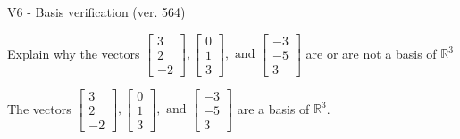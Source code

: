 \begin{exercise}
  \begin{exerciseTitle}V6 - Basis verification (ver. 564)\end{exerciseTitle}
  \begin{exerciseStatement}
    Explain why the vectors \(\left[\begin{array}{r}
3 \\
2 \\
-2
\end{array}\right] , \left[\begin{array}{r}
0 \\
1 \\
3
\end{array}\right] , \text{ and } \left[\begin{array}{r}
-3 \\
-5 \\
3
\end{array}\right]\) are or are not a basis of \(\mathbb{R}^3\)	


  \end{exerciseStatement}
  \begin{exerciseAnswer}
   The vectors \(\left[\begin{array}{r}
3 \\
2 \\
-2
\end{array}\right] , \left[\begin{array}{r}
0 \\
1 \\
3
\end{array}\right] , \text{ and } \left[\begin{array}{r}
-3 \\
-5 \\
3
\end{array}\right]\) 
  	 are  a basis of \(\mathbb{R}^3\).
  


  \end{exerciseAnswer}
\end{exercise}
